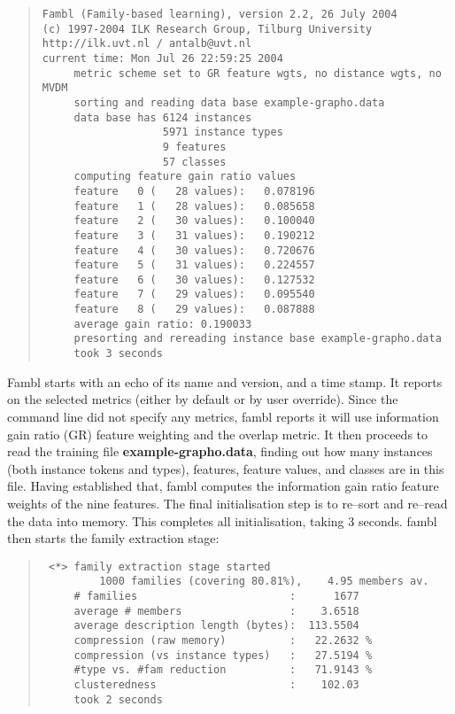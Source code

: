 \documentclass[11pt]{article}
\begin{document}
\begin{quote}
{\tiny
\begin{verbatim}
Fambl (Family-based learning), version 2.2, 26 July 2004
(c) 1997-2004 ILK Research Group, Tilburg University
http://ilk.uvt.nl / antalb@uvt.nl
current time: Mon Jul 26 22:59:25 2004
     metric scheme set to GR feature wgts, no distance wgts, no MVDM
     sorting and reading data base example-grapho.data
     data base has 6124 instances
                   5971 instance types
                   9 features
                   57 classes
     computing feature gain ratio values
     feature   0 (   28 values):   0.078196
     feature   1 (   28 values):   0.085658
     feature   2 (   30 values):   0.100040
     feature   3 (   31 values):   0.190212
     feature   4 (   30 values):   0.720676
     feature   5 (   31 values):   0.224557
     feature   6 (   30 values):   0.127532
     feature   7 (   29 values):   0.095540
     feature   8 (   29 values):   0.087888
     average gain ratio: 0.190033
     presorting and rereading instance base example-grapho.data
     took 3 seconds
\end{verbatim}
}
\end{quote}

{\sc Fambl} starts with an echo of its name and version, and a time
stamp. It reports on the selected metrics (either by default or by
user override). Since the command line did not specify any metrics,
{\sc fambl} reports it will use information gain ratio (GR) feature
weighting and the overlap metric. It then proceeds to read the training
file {\bf example-grapho.data}, finding out how many instances (both
instance tokens and types), features, feature values, and classes are
in this file. Having established that, {\sc fambl} computes the
information gain ratio feature weights of the nine features. The final
initialisation step is to re--sort and re--read the data into
memory. This completes all initialisation, taking 3 seconds. {\sc
fambl} then starts the family extraction stage:

\begin{quote}
{\tiny
\begin{verbatim}
 <*> family extraction stage started
         1000 families (covering 80.81%),    4.95 members av.
     # families                        :      1677
     average # members                 :    3.6518
     average description length (bytes):  113.5504
     compression (raw memory)          :   22.2632 %
     compression (vs instance types)   :   27.5194 %
     #type vs. #fam reduction          :   71.9143 %
     clusteredness                     :    102.03
     took 2 seconds
\end{verbatim}
}
\end{quote}
\end{document}
